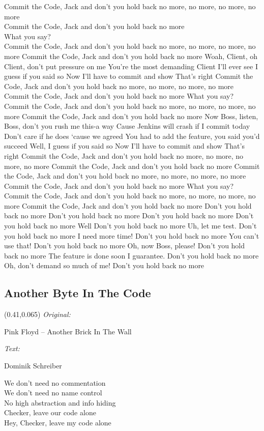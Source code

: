 \documentclass[11pt,a5paper]{article}
\newcommand\songinfo[2]{\begin{textblock}{0.5}(0.41,0.065)
		\footnotesize
		\hfill \textit{Original:} \ \ \ \ \ \ \ \ \ \ \ \ \ \ \ \ \ \ \ \ 
		
		\hfill #1
		
		\hfill  \textit{Text:} \ \ \ \ \ \ \ \ \ \ \ \ \ \ \ \ \ \ \ \ 
		
		\hfill #2
	\end{textblock}}
\begin{document}
			Commit the Code, Jack and don’t you hold back no more, no more, no more, no more \\
			Commit the Code, Jack and don’t you hold back no more \\
			
			\hfill What you say? \\
			Commit the Code, Jack and don’t you hold back no more, no more, no more, no more
			Commit the Code, Jack and don’t you hold back no more
			Woah, Client, oh Client, don’t put pressure on me
			You’re the most demanding Client I’ll ever see
			I guess if you said so
			Now I’ll have to commit and show 
			That’s right
			Commit the Code, Jack and don’t you hold back no more, no more, no more, no more
			Commit the Code, Jack and don’t you hold back no more
			What you say?
			Commit the Code, Jack and don’t you hold back no more, no more, no more, no more
			Commit the Code, Jack and don’t you hold back no more
			Now Boss, listen, Boss, don’t you rush me this-a way
			Cause Jenkins will crash if I commit today
			Don’t care if he does ‘cause we agreed
			You had to add the feature, you said you’d succeed
			Well, I guess if you said so
			Now I’ll have to commit and show 
			That’s right
			Commit the Code, Jack and don’t you hold back no more, no more, no more, no more
			Commit the Code, Jack and don’t you hold back no more
			Commit the Code, Jack and don’t you hold back no more, no more, no more, no more
			Commit the Code, Jack and don’t you hold back no more
			What you say?
			Commit the Code, Jack and don’t you hold back no more, no more, no more, no more
			Commit the Code, Jack and don’t you hold back no more
			Don’t you hold back no more
			Don’t you hold back no more
			Don’t you hold back no more
			Don’t you hold back no more
			Well
			Don’t you hold back no more
			Uh, let me test.
			Don’t you hold back no more
			I need more time!
			Don’t you hold back no more
			You can’t use that!
			Don’t you hold back no more
			Oh, now Boss, please!
			Don’t you hold back no more
			The feature is done soon I guarantee.
			Don’t you hold back no more
			Oh, don’t demand so much of me!
			Don’t you hold back no more
			\pagebreak
			\subsection{Another Byte In The Code}
			\songinfo{Pink Floyd -- Another Brick In The Wall}{Dominik Schreiber}
			We don’t need no commentation \\
			We don’t need no name control \\
			No high abstraction and info hiding \\
			Checker, leave our code alone \\
			Hey, Checker, leave my code alone \\
			
\end{document}
